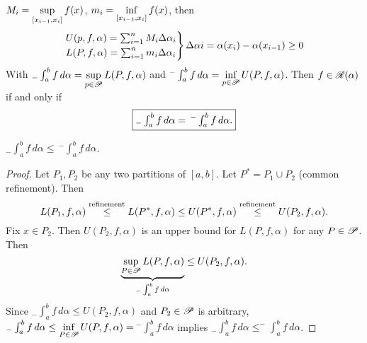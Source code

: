 \documentclass[]{article}
\begin{document}
\begin{recall}
	$\ds M_i = \sup_{[x_{i-1},x_i]} f(x)$, $\ds m_i = \inf_{[x_{i-1},x_i]} f(x)$, then 
	$$ \begin{rcases}U(p,f,\alpha) = \sum_{i=1}^n M_i\Delta\alpha_i \\ L(P,f,\alpha) = \sum_{i=1}^n m_i \Delta\alpha_i \end{rcases} \Delta\alpha i = \alpha(x_i)-\alpha(x_{i-1}) \geq 0$$
	With $_-\int_a^b f\,d\alpha = \ds\sup_{p\in\ms P} L(P,f,\alpha)$ and $^-\int_a^b f\,d\alpha = \ds\inf_{p\in\ms P} U(P,f,\alpha)$.
	Then $f\in\ms R(\alpha)$ if and only if $$\fbox{$_-\int_a^bf\,d\alpha = \,^-\int_a^bf\,d\alpha$.}$$
\end{recall}
\begin{theorem}
	\label{thm-6-5} $_-\int_a^bf\,d\alpha \leq\,^-\int_a^bf\,d\alpha$.
\end{theorem}
\begin{proof}
	Let $P_1,P_2$ be any two partitions of $[a,b]$. Let $P^* = P_1\cup P_2$ (common refinement).
	Then $$L(P_1,f,\alpha) \os{\text{refinement}}\leq L(P^*,f,\alpha) \leq U(P^*,f,\alpha) \os{\text{refinement}}\leq U(P_2,f,\alpha). $$
	Fix $x\in P_2$. Then $U(P_2,f,\alpha)$ is an upper bound for $L(P,f,\alpha)$ for any $P\in\ms P$.
	Then $$\ub{_-\int_a^bf\,d\alpha}{\sup_{P\in\ms P} L(P,f,\alpha)} \leq U(P_2,f,\alpha). $$
	Since $_-\int_a^bf\,d\alpha \leq U(P_2,f,\alpha)$ and $P_2\in\ms P$ is arbitrary,
	$ _-\int_a^bf\,d\alpha \leq \ds\inf_{P\in\ms P} U(P,f,\alpha)=$$\, ^-\int_a^bf\,d\alpha$
	implies $_-\int_a^bf\,d\alpha \leq ^-\int_a^bf\,d\alpha$.
\end{proof}
\end{document}
